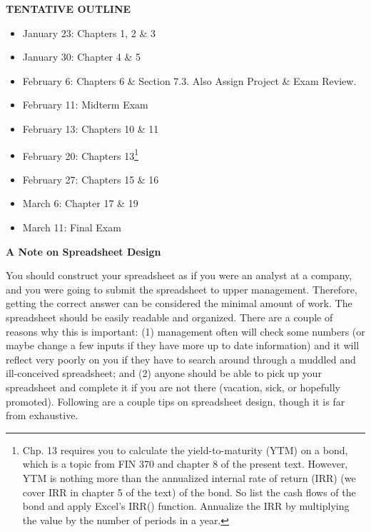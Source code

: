 \documentclass{article}
\begin{document}
\begin{center}
\pagebreak
{\bf TENTATIVE OUTLINE}
\end{center}
\begin{itemize}
\item January 23: Chapters 1, 2 \& 3
\item January 30: Chapter 4 \& 5
\item February 6: Chapters 6 \& Section 7.3.  Also Assign Project \& Exam Review.
\item February 11: Midterm Exam
\item February 13: Chapters 10 \& 11
\item February 20: Chapters 13\footnote{Chp. 13 requires you to calculate the yield-to-maturity (YTM) on a bond, which is a topic from FIN 370 and chapter 8 of the present text.  However, YTM is nothing more than the annualized internal rate of return (IRR) (we cover IRR in chapter 5 of the text) of the bond.  So list the cash flows of the bond and apply Excel's IRR() function.  Annualize the IRR by multiplying the value by the number of periods in a year.}
\item February 27: Chapters 15 \& 16
\item March 6:  Chapter 17 \& 19
\item March 11:  Final Exam
\end{itemize}
\pagebreak
\begin{center}
{\bf A Note on Spreadsheet Design}  
\end{center}
You should construct your spreadsheet as if you were an analyst at a company, and you were going to submit the spreadsheet to upper management.  Therefore, getting the correct answer can be considered the minimal amount of work.  The spreadsheet should be easily readable and organized.  There are a couple of reasons why this is important: (1) management often will check some numbers (or maybe change a few inputs if they have more up to date information) and it will reflect very poorly on you if they have to search around through a muddled and ill-conceived spreadsheet; and (2) anyone should be able to pick up your spreadsheet and complete it if you are not there (vacation, sick, or hopefully promoted).  Following are a couple tips on spreadsheet design, though it is far from exhaustive.\\
\end{document}

